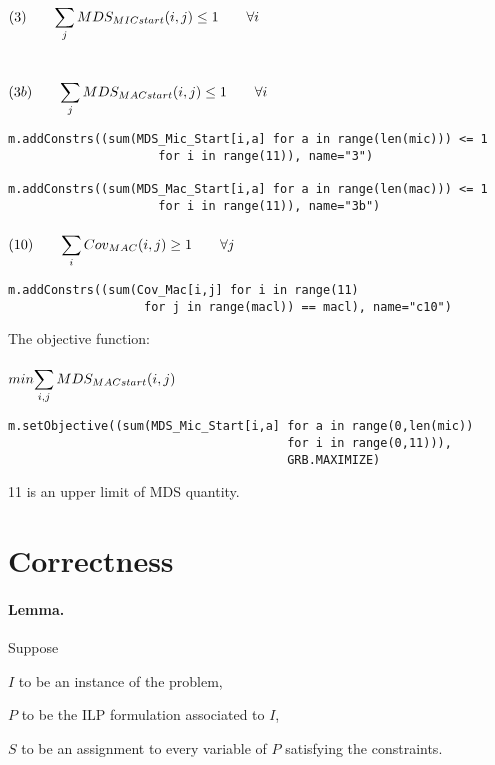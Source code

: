 \noindent $(3) \qquad \mathlarger{\sum_{j} MDS_{MICstart}(i,j)\leq 1 \qquad \forall i}$  \\\\\\
$(3b) \qquad \mathlarger{\sum_{j} MDS_{MACstart}(i,j)\leq 1 \qquad \forall i}$

\begin{verbatim}
m.addConstrs((sum(MDS_Mic_Start[i,a] for a in range(len(mic))) <= 1
                     for i in range(11)), name="3")

m.addConstrs((sum(MDS_Mac_Start[i,a] for a in range(len(mac))) <= 1
                     for i in range(11)), name="3b")
\end{verbatim}
\paragraph{}
\noindent $(10) \qquad \mathlarger{\sum_{i} Cov_{MAC}(i,j) \geq 1 \qquad \forall j }$ 
\begin{verbatim}
m.addConstrs((sum(Cov_Mac[i,j] for i in range(11)
                   for j in range(macl)) == macl), name="c10")
\end{verbatim}

The objective function: \\\\

\noindent $min \mathlarger{\sum_{i,j} MDS_{MACstart}(i,j)}$

\begin{verbatim}
m.setObjective((sum(MDS_Mic_Start[i,a] for a in range(0,len(mic))
                                       for i in range(0,11))),
                                       GRB.MAXIMIZE)
\end{verbatim}

11 is an upper limit of MDS quantity.

\section{Correctness}
\label{correctness}

\paragraph{Lemma.}
Suppose

$I$ to be an instance of the problem,

$P$ to be the ILP formulation associated to $I$,

$S$ to be an assignment to every variable of $P$ satisfying the constraints.

